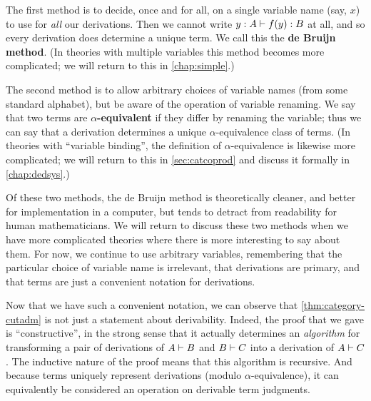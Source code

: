 The first method is to decide, once and for all, on a single variable name (say, $x$) to use for \emph{all} our derivations.
Then we cannot write $y:A \vdash f(y):B$ at all, and so every derivation does determine a unique term.
We call this the \textbf{de Bruijn method}.
(In theories with multiple variables this method becomes more complicated; we will return to this in \cref{chap:simple}.)

The second method is to allow arbitrary choices of variable names (from some standard alphabet), but be aware of the operation of variable renaming.
We say that two terms are \textbf{$\alpha$-equivalent} if they differ by renaming the variable; thus we can say that a derivation determines a unique $\alpha$-equivalence class of terms.
(In theories with ``variable binding'', the definition of $\alpha$-equivalence is likewise more complicated; we will return to this in \cref{sec:catcoprod} and discuss it formally in \cref{chap:dedsys}.)

Of these two methods, the de Bruijn method is theoretically cleaner, and better for implementation in a computer, but tends to detract from readability for human mathematicians.
We will return to discuss these two methods when we have more complicated theories where there is more interesting to say about them.
For now, we continue to use arbitrary variables, remembering that the particular choice of variable name is irrelevant, that derivations are primary, and that terms are just a convenient notation for derivations.

Now that we have such a convenient notation, we can observe that \cref{thm:category-cutadm} is not just a statement about derivability.
Indeed, the proof that we gave is ``constructive'', in the strong sense that it actually determines an \emph{algorithm} for transforming a pair of derivations of $A\vdash B$ and $B\vdash C$ into a derivation of $A\vdash C$.
The inductive nature of the proof means that this algorithm is recursive.
And because terms uniquely represent derivations (modulo $\alpha$-equivalence), it can equivalently be considered an operation on derivable term judgments.

